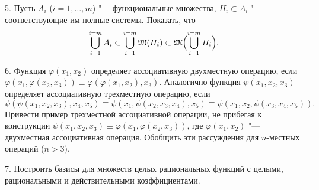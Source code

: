 5. Пусть $A_i$ ($i=1,\dots,m$) "--- функциональные множества,
$H_i\subset A_i$ "--- соответствующие им полные системы. Показать, что
\[
\bigcup_{i=1}^{i=m}A_i\subset\bigcup_{i=1}^{i=m}\mathfrak M(H_i)\subset\mathfrak M\Bigl(\bigcup_{i=1}^{i=m}H_i\Bigr).
\]

6. Функция $\varphi(x_1,x_2)$ определяет ассоциативную двухместную
операцию, если $\varphi(x_1,\varphi(x_2,x_3))\equiv\varphi(\varphi(x_1,x_2),x_3)$.
Аналогично функция $\psi(x_1,x_2,x_3)$ определяет ассоциативную
трехместную операцию, если
\[
\psi(\psi(x_1,x_2,x_3),x_4,x_5)\equiv\psi(x_1,\psi(x_2,x_3,x_4),x_5)\equiv\psi(x_1,x_2,\psi(x_3,x_4,x_5)).
\]
Привести пример трехместной ассоциативной операции, не прибегая
к конструкции $\psi(x_1,x_2,x_3)\equiv\varphi(x_1,\varphi(x_2,x_3))$, где
$\varphi(x_1,x_2)$ "--- двухместная ассоциативная операция. Обобщить эти
рассуждения для $n$-местных операций ($n>3$).

7. Построить базисы для множеств целых рациональных функций с целыми,
рациональными и действительными коэффициентами.


